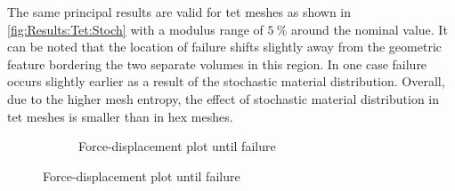 The same principal results are valid for tet meshes as shown in \autoref{fig:Results:Tet:Stoch} with a modulus range of $\SI{5}{\percent}$ around the nominal value. It can be noted that the location of failure shifts slightly away from the geometric feature bordering the two separate volumes in this region. In one case failure occurs slightly earlier as a result of the stochastic material distribution. Overall, due to the higher mesh entropy, the effect of stochastic material distribution in tet meshes is smaller than in hex meshes.


\begin{figure}[htbp]
  \setlength{\figheight}{7cm}
  \begin{subfigure}{0.55\linewidth}
    \begin{minipage}[b][\figheight]{\linewidth}
    \centering
    \tikzexternalenable
    \tikzexternaldisable
    \end{minipage}
    \caption{Force-displacement plot until failure}
    \label{fig:Results:Tet:Stoch:FD0-4_1-2}
  \end{subfigure}

\end{figure}
